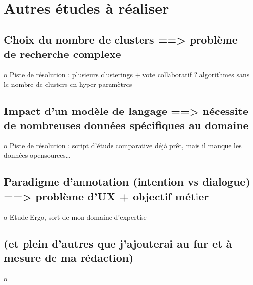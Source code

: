     \section{Autres études à réaliser}
	\label{section:4.7-ETUDES-DIVERSES}

        \subsection{Choix du nombre de clusters ==> problème de recherche complexe}
            o	Piste de résolution : plusieurs clusterings + vote collaboratif ? algorithmes sans le nombre de clusters en hyper-paramètres

        \subsection{Impact d'un modèle de langage ==> nécessite de nombreuses données spécifiques au domaine}
            o	Piste de résolution : script d'étude comparative déjà prêt, mais il manque les données opensources… 

        \subsection{Paradigme d’annotation (intention vs dialogue) ==> problème d'UX + objectif métier}
            o	Etude Ergo, sort de mon domaine d'expertise

        \subsection{(et plein d'autres que j'ajouterai au fur et à mesure de ma rédaction)}
            o	
